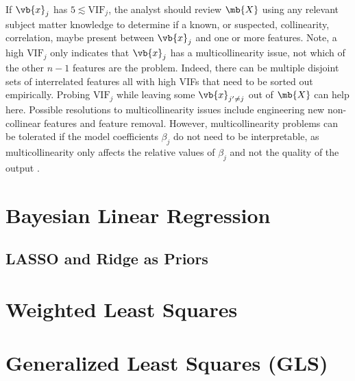 If $\vb{x}_{j}$ has $5 \lesssim \text{VIF}_{j}$,
the analyst should review $\mb{X}$ using any relevant subject matter knowledge
to determine if a known, or suspected, collinearity, \ie correlation,
maybe present between $\vb{x}_{j}$ and one or more features.
Note, a high $\text{VIF}_{j}$ only indicates that $\vb{x}_{j}$ has a multicollinearity issue,
not which of the other $n-1$ features are the problem.
Indeed, there can be multiple disjoint sets of interrelated features all with high VIFs
that need to be sorted out empirically.
Probing $\text{VIF}_{j}$ while leaving some $\vb{x}_{j' \neq j}$ out of $\mb{X}$ can help here.
Possible resolutions to multicollinearity issues include
engineering new non-collinear features and feature removal.
However, multicollinearity problems can be tolerated
if the model coefficients $\beta_{j}$ do not need to be interpretable,
as multicollinearity only affects the relative values of $\beta_{j}$
and not the quality of the output \yhat.

\section{Bayesian Linear Regression}
\label{regression:bayesian_linear}

\subsection{LASSO and Ridge as Priors}
\label{regression:bayesian_linear:lasso_vs_ridge}

\section{Weighted Least Squares}
\label{regression:WLS}

\section{Generalized Least Squares (GLS)}
\label{regression:GLS}

